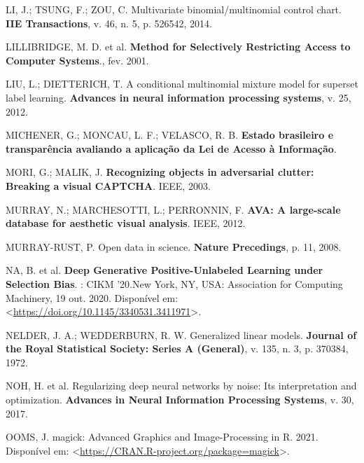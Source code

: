 \documentclass[12pt,twoside,brazilian]{book}
\newlength{\cslhangindent}
\newlength{\cslentryspacingunit} %
\newenvironment{CSLReferences}[2] %
 {%
  \setlength{\parindent}{0pt}
  \ifodd #1
  \let\oldpar\par
  \def\par{\hangindent=\cslhangindent\oldpar}
  \fi
  \setlength{\parskip}{#2\cslentryspacingunit}
 }%
 {}
\begin{document}
\begin{CSLReferences}{0}{1}
\leavevmode{}%
LI, J.; TSUNG, F.; ZOU, C. Multivariate binomial/multinomial control
chart. \textbf{IIE Transactions}, v. 46, n. 5, p. 526542, 2014.

\leavevmode{}%
LILLIBRIDGE, M. D. et al. \textbf{Method for Selectively Restricting
Access to Computer Systems}., fev. 2001.

\leavevmode{}%
LIU, L.; DIETTERICH, T. A conditional multinomial mixture model for
superset label learning. \textbf{Advances in neural information
processing systems}, v. 25, 2012.

\leavevmode{}%
MICHENER, G.; MONCAU, L. F.; VELASCO, R. B. \textbf{Estado brasileiro e
transparência avaliando a aplicação da Lei de Acesso à Informação}.

\leavevmode{}%
MORI, G.; MALIK, J. \textbf{Recognizing objects in adversarial clutter:
Breaking a visual CAPTCHA}. IEEE, 2003.

\leavevmode{}%
MURRAY, N.; MARCHESOTTI, L.; PERRONNIN, F. \textbf{AVA: A large-scale
database for aesthetic visual analysis}. IEEE, 2012.

\leavevmode{}%
MURRAY-RUST, P. Open data in science. \textbf{Nature Precedings}, p. 11,
2008.

\leavevmode{}%
NA, B. et al. \textbf{Deep Generative Positive-Unlabeled Learning under
Selection Bias}. : CIKM '20.New York, NY, USA: Association for Computing
Machinery, 19 out. 2020. Disponível em:
\textless{}\url{https://doi.org/10.1145/3340531.3411971}\textgreater.

\leavevmode{}%
NELDER, J. A.; WEDDERBURN, R. W. Generalized linear models.
\textbf{Journal of the Royal Statistical Society: Series A (General)},
v. 135, n. 3, p. 370384, 1972.

\leavevmode{}%
NOH, H. et al. Regularizing deep neural networks by noise: Its
interpretation and optimization. \textbf{Advances in Neural Information
Processing Systems}, v. 30, 2017.

\leavevmode{}%
OOMS, J. magick: Advanced Graphics and Image-Processing in R. 2021.
Disponível em:
\textless{}\url{https://CRAN.R-project.org/package=magick}\textgreater.


\end{CSLReferences}
\end{document}
